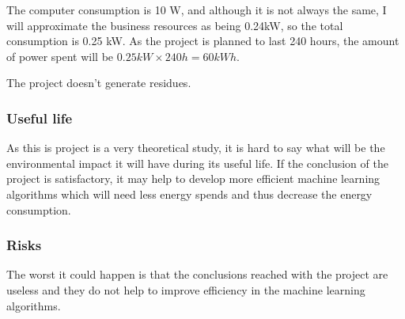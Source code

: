 \documentclass[a4paper]{article}
\begin{document}
            The computer consumption is 10 W, and although it is not always the same, I will approximate the business resources as being 0.24kW, so the total consumption is 0.25 kW. As the project is planned to last 240 hours, the amount of power spent will be \(0.25 kW \times 240 h = 60 kWh\).

            The project doesn't generate residues.

            \subsubsection{Useful life}

            As this is project is a very theoretical study, it is hard to say what will be the environmental impact it will have during its useful life. If the conclusion of the project is satisfactory, it may help to develop more efficient machine learning algorithms which will need less energy spends and thus decrease the energy consumption.


            \subsubsection{Risks}

            The worst it could happen is that the conclusions reached with the project are useless and they do not help to improve efficiency in the machine learning algorithms.
\end{document}
